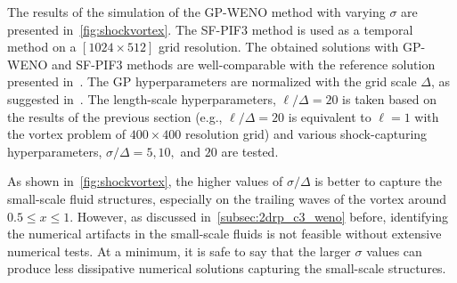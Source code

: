 The results of the simulation of the GP-WENO method with varying \( \sigma \)
are presented in~\cref{fig:shockvortex}.
The SF-PIF3 method is used as a temporal method on a \( [1024 \times 512] \) grid resolution.
The obtained solutions with GP-WENO and SF-PIF3 methods are
well-comparable with the reference solution presented in~\cite{cheng2019two,galbraith5th}.
The GP hyperparameters are normalized with the grid scale \( \Delta \),
as suggested in~\cite{reyes2018new,reyes2019variable}.
The length-scale hyperparameters, \( \ell/\Delta = 20 \) is taken
based on the results of the previous section
(e.g., \( \ell/\Delta = 20 \) is equivalent to \( \ell = 1 \) with the vortex problem of \( 400 \times 400 \) resolution grid)
and various shock-capturing hyperparameters, \( \sigma/\Delta = 5, 10, \) and \( 20 \) are tested.

As shown in~\cref{fig:shockvortex}, the higher values of \( \sigma/\Delta \) is better
to capture the small-scale fluid structures, especially on the trailing waves of the vortex
around \( 0.5 \le x \le 1 \).
However, as discussed in~\cref{subsec:2drp_c3_weno} before,
identifying the numerical artifacts in the small-scale fluids is not feasible
without extensive numerical tests.
At a minimum, it is safe to say that the larger \( \sigma \) values
can produce less dissipative numerical solutions capturing the small-scale structures.
